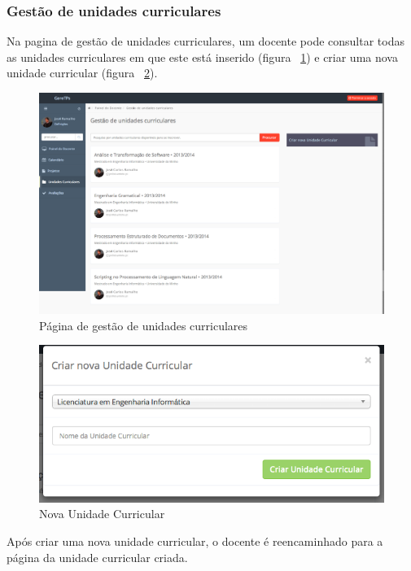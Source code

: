 \subsubsection{Gestão de unidades curriculares}

Na pagina de gestão de unidades curriculares, um docente pode consultar todas as unidades curriculares em que este está inserido (figura ~\ref{fig:teacher_ucs_index}) e criar uma nova unidade curricular (figura ~\ref{fig:teacher_new_uc}).


\begin{figure}[H]
  \centering
  \includegraphics[width=1\textwidth,center]{images/implementacao/docentes/ucs_index}
  \caption{Página de gestão de unidades curriculares}
  \label{fig:teacher_ucs_index}
\end{figure}

\begin{figure}[H]
  \centering
  \includegraphics[width=1\textwidth,center]{images/implementacao/docentes/new_uc}
  \caption{Nova Unidade Curricular}
  \label{fig:teacher_new_uc}
\end{figure}

Após criar uma nova unidade curricular, o docente é reencaminhado para a página da unidade curricular criada.

